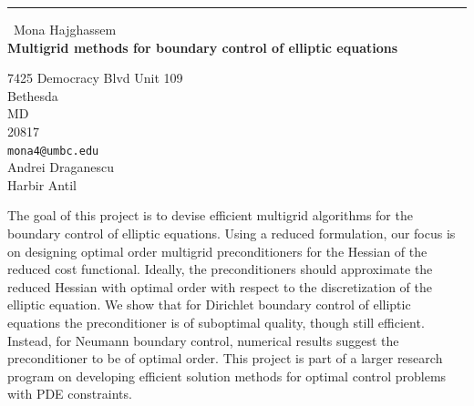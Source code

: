 \documentclass{report}
\begin{document}
\begin{center}
\rule{6in}{1pt} \
{\large Mona Hajghassem \\
{\bf Multigrid methods for boundary control of elliptic equations}}

7425 Democracy Blvd Unit 109 \\ Bethesda \\ MD \\ 20817
\\
{\tt mona4@umbc.edu}\\
Andrei Draganescu\\
Harbir Antil\end{center}

The goal of this project is to devise efficient multigrid algorithms for
the boundary control of elliptic equations. Using a reduced formulation,
our focus is on designing optimal order multigrid preconditioners for the
Hessian of the reduced cost functional. Ideally, the preconditioners
should approximate the reduced Hessian with optimal order with respect to
the discretization of the elliptic equation. We show that for Dirichlet
boundary control of elliptic equations the preconditioner is of
suboptimal quality, though still efficient. Instead, for Neumann boundary
control, numerical results suggest the preconditioner to be of optimal
order. This project is part of a larger research program on developing
efficient solution methods for optimal control problems with PDE
constraints.
\end{document}
